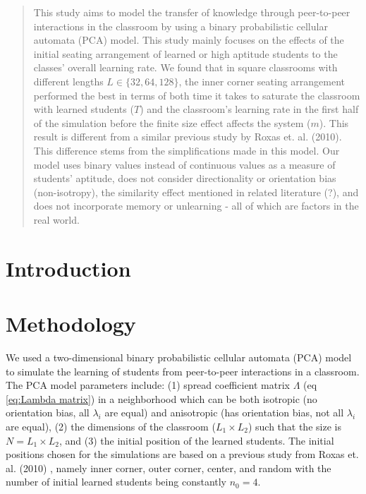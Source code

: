 \documentclass[10pt,a4paper,twoside]{article}
\begin{document}
\begin{abstract}
\noindent
This study aims to model the transfer of knowledge through peer-to-peer interactions in the classroom by using a binary probabilistic cellular automata (PCA) model. This study mainly focuses on the effects of the  initial seating arrangement of learned or high aptitude students to the classes' overall learning rate. We found that in square classrooms with different lengths $L \in\lbrace32,64,128\rbrace$, the inner corner seating arrangement performed the best in terms of both time it takes to saturate the classroom with learned students ($T$) and the classroom’s learning rate in the first half of the simulation before the finite size effect affects the system ($m$). This result is different from a similar previous study by Roxas et. al. (2010). This difference stems from the simplifications made in this model. Our model uses binary values instead of continuous values as a measure of students’ aptitude, does not consider directionality or orientation bias (non-isotropy), the similarity effect mentioned in related literature (?), and does not incorporate memory or unlearning - all of which are factors in the real world.


\end{abstract}

\maketitle
\thispagestyle{titlestyle}


\section{Introduction}\label{sec:intro}


\section{Methodology}\label{sec:methods}
We used a two-dimensional binary probabilistic cellular automata (PCA) model to simulate the learning of students from peer-to-peer interactions in a classroom. The PCA model parameters include: (1) spread coefficient matrix $\Lambda$ (eq \ref{eq:Lambda matrix}) in a neighborhood which can be both isotropic (no orientation bias, all $\lambda_i$ are equal) and anisotropic (has orientation bias, not all $\lambda_i$ are equal), (2) the dimensions of the classroom ($L_1 \times L_2$) such that the size is $N=L_1 \times L_2$, and (3) the initial position of the learned students. The initial positions chosen for the simulations are based on a previous study from Roxas et. al. (2010) \cite{roxas2010seating}, namely inner corner, outer corner, center, and random with the number of initial learned students being constantly $n_0 = 4$. 
\end{document}
